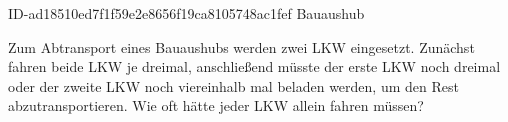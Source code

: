 \begin{exercise}
      {ID-ad18510ed7f1f59e2e8656f19ca8105748ac1fef}
      {Bauaushub}
  \ifproblem\problem\par
    Zum Abtransport eines Bauaushubs werden zwei LKW eingesetzt. Zunächst fahren
    beide LKW je dreimal, anschließend müsste der erste LKW noch dreimal oder der
    zweite LKW noch viereinhalb mal beladen werden, um den Rest abzutransportieren.
    Wie oft hätte jeder LKW allein fahren müssen?
  \fi
\end{exercise}

